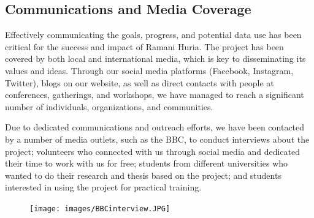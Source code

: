 \documentclass[a4paper,12pt,twoside]{article}
\begin{document}
\newpage
\subsection{Communications and Media Coverage}
Effectively communicating the goals, progress, and potential data use has been critical for the success and impact of Ramani Huria. The project has been covered by both local and international media, which is key to disseminating its values and ideas. Through our social media platforms (Facebook, Instagram, Twitter), blogs on our website, as well as direct contacts with people at conferences, gatherings, and workshops, we have managed to reach a significant number of individuals, organizations, and communities. 

Due to dedicated communications and outreach efforts, we have been contacted by a number of media outlets, such as the BBC, to conduct interviews about the project; volunteers who connected with us through social media and dedicated their time to work with us for free; students from different universities who wanted to do their research and thesis based on the project; and students interested in using the project for practical training.
\begin{figure}[h]
	\centering
	\texttt{[image: images/BBCinterview.JPG]}
\end{figure}

\newpage
\thispagestyle{empty}
\clearpage



\newpage
\end{document}
